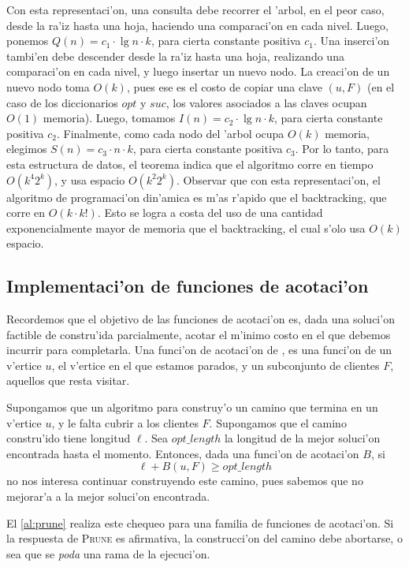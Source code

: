 Con esta representaci'on, una consulta debe recorrer el 'arbol, en el peor caso, desde la ra'iz hasta una hoja, haciendo una comparaci'on en cada nivel. Luego, ponemos $Q(n) = c_1 \cdot \lg n \cdot k$, para cierta constante positiva $c_1$. Una inserci'on tambi'en debe descender desde la ra'iz hasta una hoja, realizando una comparaci'on en cada nivel, y luego insertar un nuevo nodo. La creaci'on de un nuevo nodo toma $O(k)$, pues ese es el costo de copiar una clave $(u, F)$ (en el caso de los diccionarios $opt$ y $suc$, los valores asociados a las claves ocupan $O(1)$ memoria). Luego, tomamos $I(n) = c_2 \cdot \lg n \cdot k$, para cierta constante positiva $c_2$. Finalmente, como cada nodo del 'arbol ocupa $O(k)$ memoria, elegimos $S(n) = c_3 \cdot n \cdot k$, para cierta constante positiva $c_3$. Por lo tanto, para esta estructura de datos, el teorema indica que el algoritmo corre en tiempo $O(k^4 2^k)$, y usa espacio $O(k^2 2^k)$. Observar que con esta representaci'on, el algoritmo de programaci'on din'amica es m'as r'apido que el backtracking, que corre en $O(k \cdot k!)$. Esto se logra a costa del uso de una cantidad exponencialmente mayor de memoria que el backtracking, el cual s'olo usa $O(k)$ espacio.

\subsection{Implementaci'on de funciones de acotaci'on}

Recordemos que el objetivo de las funciones de acotaci'on es, dada una soluci'on factible de  constru'ida parcialmente, acotar el m'inimo costo en el que debemos incurrir para completarla. Una funci'on de acotaci'on de , es una funci'on de un v'ertice $u$, el v'ertice en el que estamos parados, y un subconjunto de clientes $F$, aquellos que resta visitar.

Supongamos que un algoritmo para  construy'o un camino que termina en un v'ertice $u$, y le falta cubrir a los clientes $F$. Supongamos que el camino constru'ido tiene longitud $\ell$. Sea $opt\_length$ la longitud de la mejor soluci'on encontrada hasta el momento. Entonces, dada una funci'on de acotaci'on $B$, si
\[\ell + B(u, F) \geq opt\_length\]
\noindent
no nos interesa continuar construyendo este camino, pues sabemos que no mejorar'a a la mejor soluci'on encontrada.

El \autoref{al:prune} realiza este chequeo para una familia de funciones de acotaci'on. Si la respuesta de \textsc{Prune} es afirmativa, la construcci'on del camino debe abortarse, o sea que se \textit{poda} una rama de la ejecuci'on.

